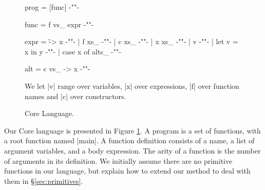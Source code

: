 \documentclass[preprint]{sigplanconf}
\begin{document}
\begin{figure}
\ignore\begin{code}
prog   =  [func]           {-""-}

func   =  f vs_ expr       {-""-}

expr   =  \v -> x          {-""-}
       |  f xs_            {-""-}
       |  c xs_            {-""-}
       |  x xs_            {-""-}
       |  v                {-""-}
       |  let v = x in y   {-""-}
       |  case x of alts_  {-""-}

alt    =  c vs_ -> x       {-""-}
\end{code}
\begin{comment}
\begin{code}
data Expr = ELam String Expr
          | EFun String [Expr]
          | ECon String [Expr]
          | EApp Expr [Expr]
          | EVar String
          | ECase Expr [Alt]
          | ELet String Expr Expr

data Alt = Alt String [String] Expr

arity :: String -> Int
body :: String -> Expr
args :: String -> [String]
rhs :: Alt -> Expr
\end{code}
\end{comment}

We let |v| range over variables, |x| over expressions, |f| over function names and |c| over constructors.
\caption{Core Language.}
\label{fig:core}
\end{figure}

Our Core language is presented in Figure \ref{fig:core}. A program is a set of functions, with a root function named |main|. A function definition consists of a name, a list of argument variables, and a body expression. The arity of a function is the number of arguments in its definition. We initially assume there are no primitive functions in our language, but explain how to extend our method to deal with them in \S\ref{sec:primitives}.
\end{document}
